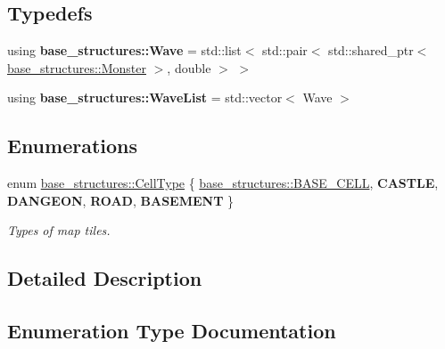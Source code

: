 \subsection*{Typedefs}
\begin{DoxyCompactItemize}
\item 
\mbox{\label{group__map__interface_gaf3cfb0493cb701414cde95f5293de7c7}} 
using {\bfseries base\+\_\+structures\+::\+Wave} = std\+::list$<$ std\+::pair$<$ std\+::shared\+\_\+ptr$<$ \hyperlink{classbase__structures_1_1Monster}{base\+\_\+structures\+::\+Monster} $>$, double $>$ $>$
\item 
\mbox{\label{group__map__interface_ga56dac6ab8bd99d328624c5c79cb8e36b}} 
using {\bfseries base\+\_\+structures\+::\+Wave\+List} = std\+::vector$<$ Wave $>$
\end{DoxyCompactItemize}
\subsection*{Enumerations}
\begin{DoxyCompactItemize}
\item 
enum \hyperlink{group__map__interface_ga7a79b122dbd494c4eea32680c5df34c1}{base\+\_\+structures\+::\+Cell\+Type} \{ \newline
\hyperlink{group__map__interface_gga7a79b122dbd494c4eea32680c5df34c1a27c590e53e5b28bde1d1b9cfb8a18cd5}{base\+\_\+structures\+::\+B\+A\+S\+E\+\_\+\+C\+E\+LL}, 
{\bfseries C\+A\+S\+T\+LE}, 
{\bfseries D\+A\+N\+G\+E\+ON}, 
{\bfseries R\+O\+AD}, 
\newline
{\bfseries B\+A\+S\+E\+M\+E\+NT}
 \}\begin{DoxyCompactList}\small\item\em Types of map tiles. \end{DoxyCompactList}
\end{DoxyCompactItemize}


\subsection{Detailed Description}


\subsection{Enumeration Type Documentation}
\mbox{\label{group__map__interface_ga7a79b122dbd494c4eea32680c5df34c1}} 
